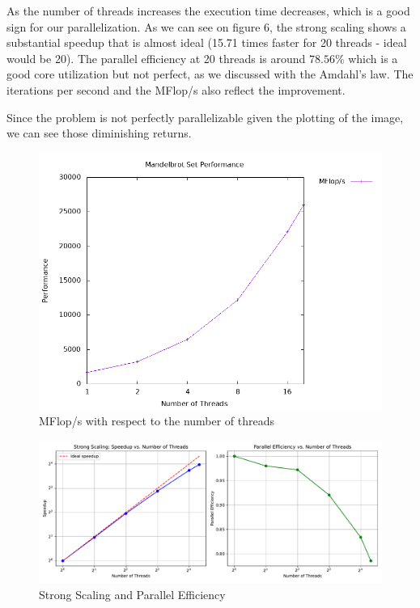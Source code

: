 \documentclass[unicode,11pt,a4paper,oneside,numbers=endperiod,openany]{scrartcl}
\begin{document}
As the number of threads increases the execution time decreases, which is a good 
sign for our parallelization. As we can see on figure 6, the strong scaling shows a substantial
speedup that is almost ideal (15.71 times faster for 20 threads - ideal would be 20). 
The parallel efficiency at 20 threads is around $78.56\%$ which is a good core utilization 
but not perfect, as we discussed with the Amdahl's law. The iterations per second and 
the MFlop/s also reflect the improvement. 

Since the problem is not perfectly parallelizable given the plotting of the image,
we can see those diminishing returns. 


\begin{figure}[H]
    \centering
    \includegraphics[width=\textwidth]{./img/exe2/mandelbrot_performance.png}
    \caption{MFlop/s with respect to the number of threads}
\end{figure}

\begin{figure}[H]
    \centering
    \includegraphics[width=\textwidth]{./img/exe2/mandel_plot.pdf}
    \caption{Strong Scaling and Parallel Efficiency}
\end{figure}
\end{document}
